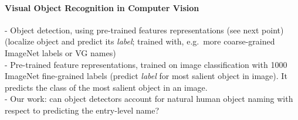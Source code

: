 



\paragraph{Visual Object Recognition in Computer Vision}
- Object detection, using pre-trained features representations (see next point) (localize object and predict its \textit{label}; trained with, e.g.\ more coarse-grained ImageNet labels or VG names)\\
- Pre-trained feature representations, trained on image classification with 1000 ImageNet fine-grained labels (predict \textit{label} for most salient object in image). It predicts the class of the most salient object in an image. \\
- Our work: can object detectors account for natural human object naming with respect to predicting the entry-level name? 